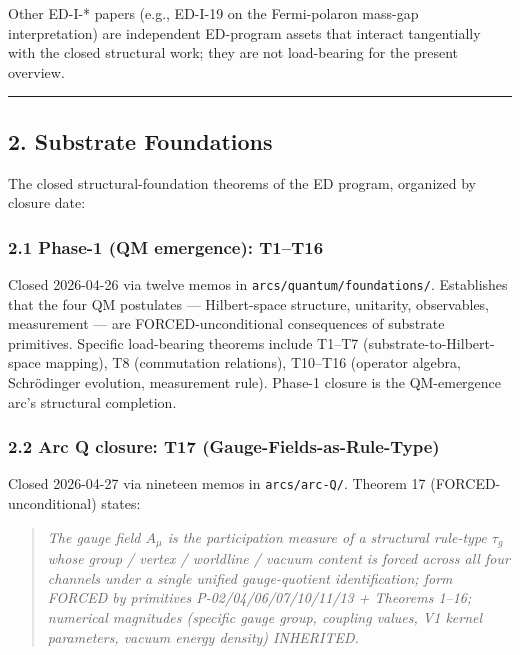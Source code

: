 \documentclass[
  11pt,
  a4paper,
]{article}
\begin{document}
Other ED-I-* papers (e.g., ED-I-19 on the Fermi-polaron mass-gap
interpretation) are independent ED-program assets that interact
tangentially with the closed structural work; they are not load-bearing
for the present overview.

\begin{center}\rule{0.5\linewidth}{0.5pt}\end{center}

\subsection{2. Substrate Foundations}\label{substrate-foundations}

The closed structural-foundation theorems of the ED program, organized
by closure date:

\subsubsection{2.1 Phase-1 (QM emergence):
T1--T16}\label{phase-1-qm-emergence-t1t16}

Closed 2026-04-26 via twelve memos in
\texttt{arcs/quantum/foundations/}. Establishes that the four QM
postulates --- Hilbert-space structure, unitarity, observables,
measurement --- are FORCED-unconditional consequences of substrate
primitives. Specific load-bearing theorems include T1--T7
(substrate-to-Hilbert-space mapping), T8 (commutation relations),
T10--T16 (operator algebra, Schrödinger evolution, measurement rule).
Phase-1 closure is the QM-emergence arc's structural completion.

\subsubsection{2.2 Arc Q closure: T17
(Gauge-Fields-as-Rule-Type)}\label{arc-q-closure-t17-gauge-fields-as-rule-type}

Closed 2026-04-27 via nineteen memos in \texttt{arcs/arc-Q/}. Theorem 17
(FORCED-unconditional) states:

\begin{quote}
\emph{The gauge field \(A_\mu\) is the participation measure of a
structural rule-type \(\tau_g\) whose group / vertex / worldline /
vacuum content is forced across all four channels under a single unified
gauge-quotient identification; form FORCED by primitives
P-02/04/06/07/10/11/13 + Theorems 1--16; numerical magnitudes (specific
gauge group, coupling values, V1 kernel parameters, vacuum energy
density) INHERITED.}
\end{quote}
\end{document}
